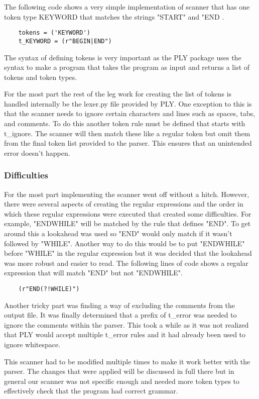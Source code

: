 \documentclass[12pt, oneside]{article}   	%
\begin{document}
The following code shows a very simple implementation of scanner that has one token type KEYWORD that matches the strings "START" and "END .
\begin{lstlisting}
	tokens = ('KEYWORD')
	t_KEYWORD = (r"BEGIN|END")
\end{lstlisting}
The syntax of defining tokens is very important as the PLY package uses the syntax to make a program that takes the program as input and returns a list of tokens and token types.

For the most part the rest of the leg work for creating the list of tokens is handled internally be the lexer.py file provided by PLY. One exception to this is that the scanner needs to ignore certain characters and lines such as spaces, tabs, and comments. To do this another token rule must be defined that starts with t\_ignore. The scanner will then match these like a regular token but omit them from the final token list provided to the parser. This ensures that an unintended error doesn't happen.

\subsubsection{Difficulties}
For the most part implementing the scanner went off without a hitch. However, there were several aspects of creating the regular expressions and the order in which these regular expressions were executed that created some difficulties. For example, "ENDWHILE" will be matched by the rule 
that defines "END". To get around this a lookahead was used so "END" would only match if it wasn't followed by "WHILE". Another way to do this would be to put "ENDWHILE" before "WHILE" in the regular expression but it was decided that the lookahead was more robust and easier to read. The following lines of code  shows a regular expression that will match "END" but not "ENDWHILE".
\begin{lstlisting}
	(r"END(?!WHILE)")
\end{lstlisting}

Another tricky part was finding a way of excluding the comments from the output file. It was finally determined that a prefix of t\_error was needed to ignore the comments within the parser. This took a while as it was not realized that PLY would accept multiple t\_error rules and it had already been used to ignore whitespace.
 
This scanner had to be modified multiple times to make it work better with the parser. The changes that were applied
will be discussed in full there but in general our scanner was not specific enough and needed more token types to effectively check that the program had correct grammar.
	
\end{document}
